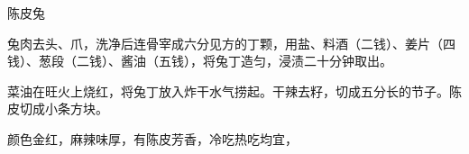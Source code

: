 \begin{recipe}{陈皮兔}

\ingredients


\preparation

\step 兔肉去头、爪，洗净后连骨宰成六分见方的丁颗，用盐、料酒（二钱）、姜片（四
钱）、葱段（二钱）、酱油（五钱），将兔丁造匀，浸渍二十分钟取出。

\step 菜油在旺火上烧红，将兔丁放入炸干水气捞起。干辣去籽，切成五分长的节子。陈
皮切成小条方块。

\features

颜色金红，麻辣味厚，有陈皮芳香，冷吃热吃均宜，

\end{recipe}

